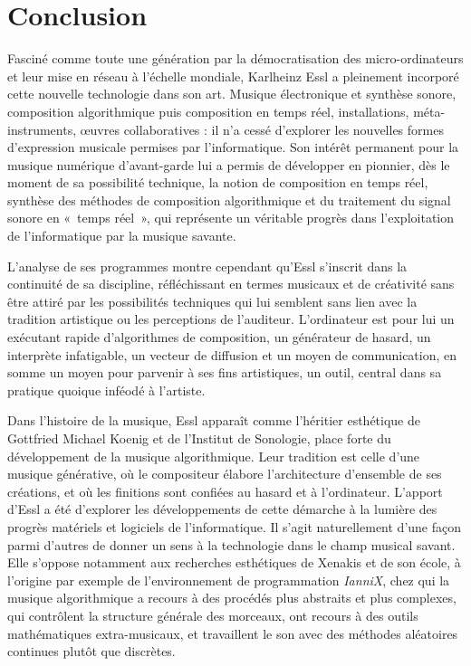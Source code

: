 \documentclass[a4paper,12pt]{article}
\newcommand{\guill}[1]{«~#1~»}
\newcommand{\zitat}[2]{\#Citation(#2)\#}
\begin{document}


\section{Conclusion}

Fasciné comme toute une génération par la démocratisation des micro-ordinateurs et leur mise en réseau à l'échelle mondiale, Karlheinz Essl a pleinement incorporé cette nouvelle technologie dans son art. Musique électronique et synthèse sonore, composition algorithmique puis composition en temps réel, installations, méta-instruments, œuvres collaboratives : il n'a cessé d'explorer les nouvelles formes d'expression musicale permises par l'informatique. Son intérêt permanent pour la musique numérique d'avant-garde lui a permis de développer en pionnier, dès le moment de sa possibilité technique, la notion de composition en temps réel, synthèse des méthodes de composition algorithmique et du traitement du signal sonore en \guill{temps réel}, qui représente un véritable progrès dans l'exploitation de l'informatique par la musique savante.

L'analyse de ses programmes montre cependant qu'Essl s'inscrit dans la continuité de sa discipline, réfléchissant en termes musicaux et de créativité sans être attiré par les possibilités techniques qui lui semblent sans lien avec la tradition artistique ou les perceptions de l'auditeur. L'ordinateur est pour lui un exécutant rapide d'algorithmes de composition, un générateur de hasard, un interprète infatigable, un vecteur de diffusion et un moyen de communication, en somme un moyen pour parvenir à ses fins artistiques, un outil, central dans sa pratique quoique inféodé à l'artiste.

Dans l'histoire de la musique, Essl apparaît comme l'héritier esthétique de Gottfried Michael Koenig et de l'Institut de Sonologie, place forte du développement de la musique algorithmique. Leur tradition est celle d'une musique générative, où le compositeur élabore l'architecture d'ensemble de ses créations, et où les finitions sont confiées au hasard et à l'ordinateur. L'apport d'Essl a été d'explorer les développements de cette démarche à la lumière des progrès matériels et logiciels de l'informatique. Il s'agit naturellement d'une façon parmi d'autres de donner un sens à la technologie dans le champ musical savant. Elle s'oppose notamment aux recherches esthétiques de Xenakis et de son école, à l'origine par exemple de l'environnement de programmation \emph{IanniX}, chez qui la musique algorithmique a recours à des procédés plus abstraits et plus complexes, qui contrôlent la structure générale des morceaux, ont recours à des outils mathématiques extra-musicaux, et travaillent le son avec des méthodes aléatoires continues plutôt que discrètes.
\end{document}
